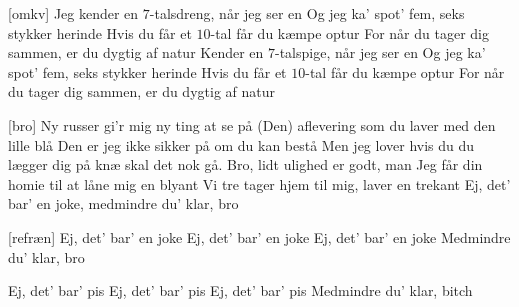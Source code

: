 \documentclass[a4paper,11pt]{article}
\begin{document}
\begin{song}
  [omkv] Jeg kender en $7$-talsdreng, når jeg ser en
Og jeg ka' spot' fem, seks stykker herinde
Hvis du får et $10$-tal får du kæmpe optur 
For når du tager dig sammen, er du dygtig af natur 
Kender en $7$-talspige, når jeg ser en
Og jeg ka' spot' fem, seks stykker herinde
Hvis du får et $10$-tal får du kæmpe optur
For når du tager dig sammen, er du dygtig af natur 

[bro] Ny russer gi'r mig ny ting at se på 
 (Den) aflevering som du laver med den lille blå
Den er jeg ikke sikker på om du kan bestå
Men jeg lover hvis du du lægger dig på knæ skal det nok gå. 
Bro, lidt ulighed er godt, man
Jeg får din homie til at låne mig en blyant
Vi tre tager hjem til mig, laver en trekant
Ej, det' bar' en joke, medmindre du' klar, bro

[refræn] Ej, det' bar' en joke
Ej, det' bar' en joke
Ej, det' bar' en joke
Medmindre du' klar, bro

Ej, det' bar' pis
Ej, det' bar' pis
Ej, det' bar' pis
Medmindre du' klar, bitch

  
\end{song}
\end{document}
